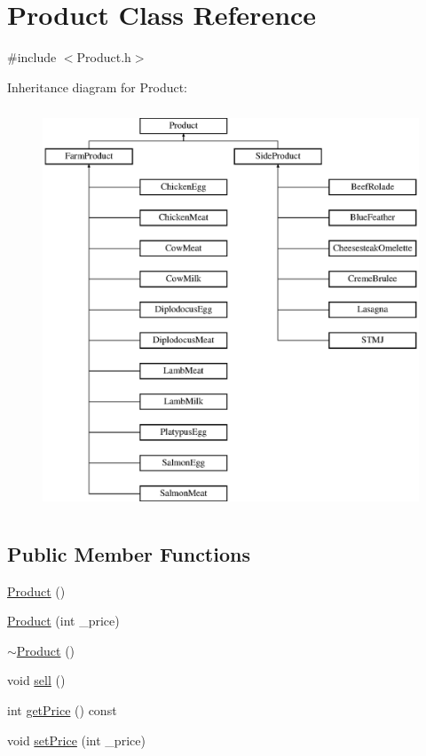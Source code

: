 \hypertarget{classProduct}{}\section{Product Class Reference}
\label{classProduct}


{\ttfamily \#include $<$Product.\+h$>$}

Inheritance diagram for Product\+:\begin{figure}[H]
\begin{center}
\leavevmode
\includegraphics[height=12.000000cm]{classProduct}
\end{center}
\end{figure}
\subsection*{Public Member Functions}
\begin{DoxyCompactItemize}
\item 
\mbox{\hyperlink{classProduct_a847c1d85e67ce387166a597579a55135}{Product}} ()
\item 
\mbox{\hyperlink{classProduct_a8befa76d00142c3fca908ba3e235eb15}{Product}} (int \+\_\+price)
\item 
\mbox{\hyperlink{classProduct_abe0afd3bea96d979185ec2cfdf681e6f}{$\sim$\+Product}} ()
\item 
void \mbox{\hyperlink{classProduct_a8061a46acea7b7888bf553a0451910e3}{sell}} ()
\item 
int \mbox{\hyperlink{classProduct_a822232ae63108d7790fae0c56d3c4171}{get\+Price}} () const
\item 
void \mbox{\hyperlink{classProduct_a278fb7c9e92ed41c01b5c9287ebe18e2}{set\+Price}} (int \+\_\+price)
\end{DoxyCompactItemize}
